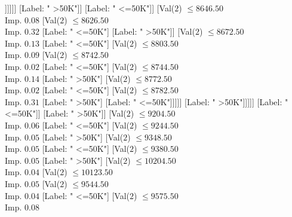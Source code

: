 \documentclass[margin=10pt]{standalone}
\begin{document}
\begin{forest}
																							[Label: " >50K"]
																							[Val($2$) $ \leq 8402.50$ \\ Imp. $0.28$
																								[Label: " <=50K"]
																								[Val($2$) $ \leq 8452.50$ \\ Imp. $0.46$
																									[Label: " >50K"]
																									[Label: " <=50K"]]]]]]
																				[Label: " >50K"]]
																			[Label: " <=50K"]]
																		[Val($2$) $ \leq 8646.50$ \\ Imp. $0.08$
																			[Val($2$) $ \leq 8626.50$ \\ Imp. $0.32$
																				[Label: " <=50K"]
																				[Label: " >50K"]]
																			[Val($2$) $ \leq 8672.50$ \\ Imp. $0.13$
																				[Label: " <=50K"]
																				[Val($2$) $ \leq 8803.50$ \\ Imp. $0.09$
																					[Val($2$) $ \leq 8742.50$ \\ Imp. $0.02$
																						[Label: " <=50K"]
																						[Val($2$) $ \leq 8744.50$ \\ Imp. $0.14$
																							[Label: " >50K"]
																							[Val($2$) $ \leq 8772.50$ \\ Imp. $0.02$
																								[Label: " <=50K"]
																								[Val($2$) $ \leq 8782.50$ \\ Imp. $0.31$
																									[Label: " >50K"]
																									[Label: " <=50K"]]]]]
																					[Label: " >50K"]]]]]
																	[Label: " <=50K"]]
																[Label: " >50K"]]
															[Val($2$) $ \leq 9204.50$ \\ Imp. $0.06$
																[Label: " <=50K"]
																[Val($2$) $ \leq 9244.50$ \\ Imp. $0.05$
																	[Label: " >50K"]
																	[Val($2$) $ \leq 9348.50$ \\ Imp. $0.05$
																		[Label: " <=50K"]
																		[Val($2$) $ \leq 9380.50$ \\ Imp. $0.05$
																			[Label: " >50K"]
																			[Val($2$) $ \leq 10204.50$ \\ Imp. $0.04$
																				[Val($2$) $ \leq 10123.50$ \\ Imp. $0.05$
																					[Val($2$) $ \leq 9544.50$ \\ Imp. $0.04$
																						[Label: " <=50K"]
																						[Val($2$) $ \leq 9575.50$ \\ Imp. $0.08$

\end{forest}
\end{document}
